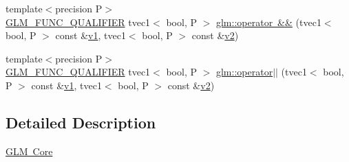 \begin{DoxyCompactItemize}
\item 
{\footnotesize template$<$precision P$>$ }\\\mbox{\hyperlink{setup_8hpp_a33fdea6f91c5f834105f7415e2a64407}{G\+L\+M\+\_\+\+F\+U\+N\+C\+\_\+\+Q\+U\+A\+L\+I\+F\+I\+ER}} tvec1$<$ bool, P $>$ \mbox{\hyperlink{namespaceglm_a1c58b6b16146e3386549aabad62f3893}{glm\+::operator \&\&}} (tvec1$<$ bool, P $>$ const \&\mbox{\hyperlink{glad_8h_a0779c3b73f9aa3a0ac5b0139b5d291d9}{v1}}, tvec1$<$ bool, P $>$ const \&\mbox{\hyperlink{glad_8h_a9a09a1837922b2b806f4589096a52049}{v2}})
\item 
{\footnotesize template$<$precision P$>$ }\\\mbox{\hyperlink{setup_8hpp_a33fdea6f91c5f834105f7415e2a64407}{G\+L\+M\+\_\+\+F\+U\+N\+C\+\_\+\+Q\+U\+A\+L\+I\+F\+I\+ER}} tvec1$<$ bool, P $>$ \mbox{\hyperlink{namespaceglm_aa0e152d191e4ff128af9434eb30aff19}{glm\+::operator$\vert$$\vert$}} (tvec1$<$ bool, P $>$ const \&\mbox{\hyperlink{glad_8h_a0779c3b73f9aa3a0ac5b0139b5d291d9}{v1}}, tvec1$<$ bool, P $>$ const \&\mbox{\hyperlink{glad_8h_a9a09a1837922b2b806f4589096a52049}{v2}})
\end{DoxyCompactItemize}


\subsection{Detailed Description}
\mbox{\hyperlink{group__core}{G\+LM Core}} 